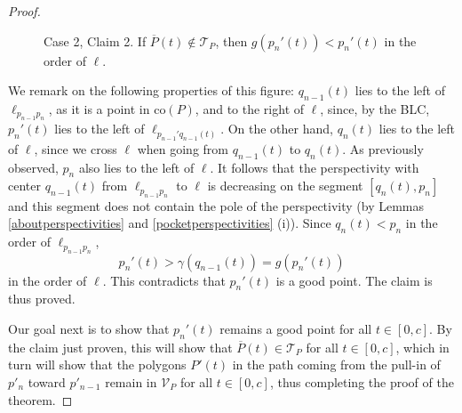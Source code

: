 \documentclass[11pt]{amsart}
\theoremstyle{remark}
\numberwithin{equation}{section}
\newcommand{\co}{\mathrm{co}}
\newcommand{\TT}{\mathcal{T}}
\newcommand{\V}{\mathcal{V}}
\begin{document}
\begin{proof}
\begin{figure}[h]


\caption{Case 2, Claim 2. If $\overline P(t)\notin \TT_P$, then $g(p_n'(t))<p_n'(t)$ in the order of  $\ell$.}
\label{VestCase2Claim2}
\end{figure}

We remark on the following properties of this figure:  $q_{n-1}(t)$ lies to the left of $\ell_{p_{n-1}p_n}$, as it is a point in $\co(P)$, and to the right of  $\ell$, since, by the BLC, $p_{n}'(t)$ lies to the left of $\ell_{p_{n-1}'q_{n-1}(t)}$.  On the other hand,   $q_n(t)$ lies to the left of $\ell$, since we cross $\ell$ when going from $q_{n-1}(t)$ to $q_n(t)$. As previously observed, $p_n$ also lies to the left of $\ell$. It follows that the perspectivity with center $q_{n-1}(t)$ from $\ell_{p_{n-1}p_n}$ to $\ell$ is decreasing on the segment 
$[q_n(t),p_n]$ and this segment does not contain the pole of the perspectivity (by Lemmas \ref{aboutperspectivities} and \ref{pocketperspectivities} (i)). Since $q_{n}(t)< p_n$ in the order of  $\ell_{p_{n-1}p_n}$,  
\[
p_n'(t)>\gamma(q_{n-1}(t))=g(p_n'(t))
\] 
in the order of  $\ell$. This contradicts that $p_n'(t)$ is a good point. The claim is thus proved.


Our goal next is to show that $p_n'(t)$ remains a good point for all $t\in [0,c]$. By the claim just proven, this will show that $\overline P(t)\in \TT_P$ for all $t\in [0,c]$, which in turn will show  that the polygons $P'(t)$ in the path  coming from the pull-in of $p'_n$ toward $p'_{n-1}$ remain in $\V_P$ for all $t\in [0,c]$, thus completing the proof of the theorem.




\end{proof}
\end{document}
